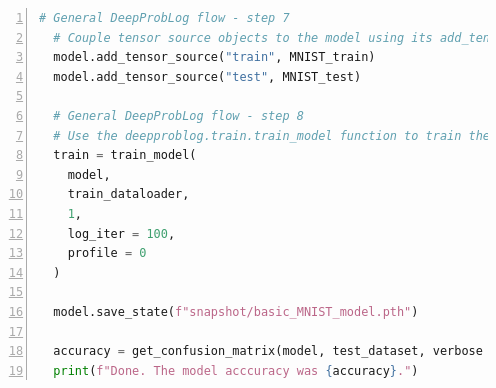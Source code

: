 \begin{lstlisting}[language=Python, caption={src/deepproblog/examples/MNIST/basic\_addition.py, the basic MNIST single-digit addition example}, numbers=left, label={lst:MNIST_addition_source_code}, captionpos=b]
  # General DeepProbLog flow - step 7
  # Couple tensor source objects to the model using its add_tensor_source method
  model.add_tensor_source("train", MNIST_train)
  model.add_tensor_source("test", MNIST_test)
  
  # General DeepProbLog flow - step 8
  # Use the deepproblog.train.train_model function to train the DeepProbLog model (which means optimizing the unknown model probabilities/parameters and the model's NNs' weights for model accuracy on a test set of queries)
  train = train_model(
    model,
    train_dataloader,
    1,
    log_iter = 100,
    profile = 0
  )
  
  model.save_state(f"snapshot/basic_MNIST_model.pth")
  
  accuracy = get_confusion_matrix(model, test_dataset, verbose = 0).accuracy()
  print(f"Done. The model acccuracy was {accuracy}.")
\end{lstlisting}